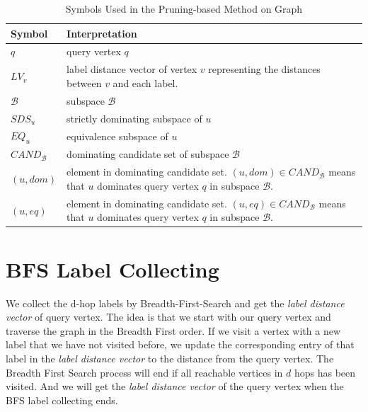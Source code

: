 \begin{table}[h]
\centering
\begin{tabular}{|l|p{11cm}|}
\hline
Symbol                      & Interpretation                                                                                                                                     \\ \hline
$q$                         & query vertex $q$                                                                                                                                   \\ \hline
$LV_v$                      & label distance vector of vertex $v$ representing the distances between $v$ and each label.                                                         \\ \hline
$\mathcal{B}$               & subspace $\mathcal{B}$                                                                                                                             \\ \hline
$\mathit{SDS}_u$            & strictly dominating subspace of $u$                                                                                                                \\ \hline
$\mathit{EQ}_u$             & equivalence subspace of $u$                                                                                                                        \\ \hline
$\mathit{CAND}_\mathcal{B}$ & dominating candidate set of subspace $\mathcal{B}$                                                                                                 \\ \hline
$(u, dom)$                  & element in dominating candidate set. $(u, dom) \in \mathit{CAND}_\mathcal{B}$ means that $u$ dominates query vertex $q$ in subspace $\mathcal{B}$. \\ \hline
$(u, eq)$                   & element in dominating candidate set. $(u, eq) \in \mathit{CAND}_\mathcal{B}$ means that $u$ dominates query vertex $q$ in subspace $\mathcal{B}$.  \\ \hline
\end{tabular}
    \caption{Symbols Used in the Pruning-based Method on Graph}
    \label{tab:symbol_graph}
\end{table}

\section{BFS Label Collecting}
\label{sec:bfs-collect}
We collect the d-hop labels by Breadth-First-Search and get the \emph{label distance vector} of query vertex. The idea is that we start with our query vertex and traverse the graph in the Breadth First order. If we visit a vertex with a new label that we have not visited before, we update the corresponding entry of that label in the \emph{label distance vector} to the distance from the query vertex. The Breadth First Search process will end if all reachable vertices in $d$ hops has been visited. And we will get the \emph{label distance vector} of the query vertex when the BFS label collecting ends.

